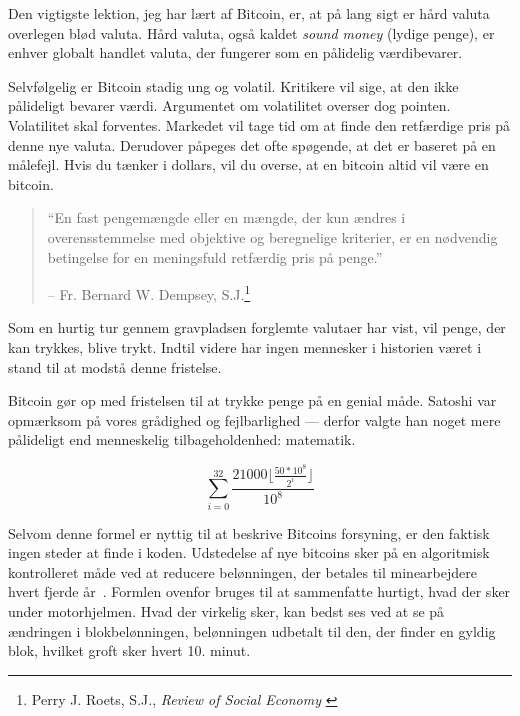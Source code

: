 Den vigtigste lektion, jeg har lært af Bitcoin, er, at på lang sigt er hård 
valuta overlegen blød valuta. Hård valuta, også kaldet \textit{sound money} 
(lydige penge), er enhver globalt handlet valuta, der fungerer som en pålidelig 
værdibevarer.

Selvfølgelig er Bitcoin stadig ung og volatil. Kritikere vil sige, at den ikke 
pålideligt bevarer værdi. Argumentet om volatilitet overser dog pointen. 
Volatilitet skal forventes. Markedet vil tage tid om at finde den retfærdige 
pris på denne nye valuta. Derudover påpeges det ofte spøgende, at det er 
baseret på en målefejl. Hvis du tænker i dollars, vil du overse, at en bitcoin 
altid vil være en bitcoin.

\begin{quotation}\begin{samepage}
\enquote{En fast pengemængde eller en mængde, der kun ændres i 
overensstemmelse med objektive og beregnelige kriterier, er en nødvendig 
betingelse for en meningsfuld retfærdig pris på penge.}
\begin{flushright} -- Fr. Bernard W. Dempsey, S.J.\footnote{Perry J. Roets, 
  S.J., \textit{Review of Social Economy} \cite{review-social-economy}}
\end{flushright}\end{samepage}\end{quotation}

\newpage

Som en hurtig tur gennem gravpladsen forglemte valutaer har vist,
vil penge, der kan trykkes, blive trykt. Indtil videre har ingen mennesker i
historien været i stand til at modstå denne fristelse.

Bitcoin gør op med fristelsen til at trykke penge på en genial
måde. Satoshi var opmærksom på vores grådighed og fejlbarlighed --- derfor 
valgte han noget mere pålideligt end menneskelig tilbageholdenhed: matematik.

\begin{center}
  \centering
  \begin{equation}
  \sum\limits_{i=0}^{32} \frac{21000 \lfloor \frac{50*10^8}{2^i} \rfloor}{10^8}
  \end{equation}
  \label{fig:supply-formula-white}
\end{center}

Selvom denne formel er nyttig til at beskrive Bitcoins forsyning, er den faktisk
ingen steder at finde i koden. Udstedelse af nye bitcoins sker på en
algoritmisk kontrolleret måde ved at reducere belønningen, der betales til
minearbejdere hvert fjerde år~\cite{btcwiki:supply}. Formlen ovenfor bruges til
at sammenfatte hurtigt, hvad der sker under motorhjelmen. Hvad der virkelig 
sker, kan bedst ses ved at se på ændringen i blokbelønningen, belønningen 
udbetalt til den, der finder en gyldig blok, hvilket groft sker hvert 10. minut.

